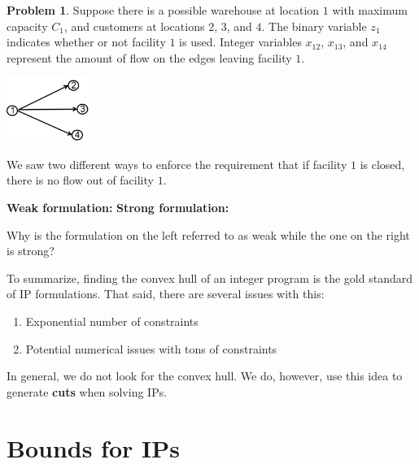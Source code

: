 \documentclass[11pt]{article}
\theoremstyle{definition}
\newtheorem{problem}{Problem}
\newcommand{\answerbox}[3]{%
  \fbox{%
    \begin{minipage}[#1]{#2}
      \hfill\vspace{#3}
    \end{minipage}
  }
}
\begin{document}
\begin{problem}
Suppose there is a possible warehouse at location $1$ with maximum capacity $C_1$, and customers at locations $2$, $3$, and $4$.  The binary variable $z_1$ indicates whether or not facility $1$ is used.  Integer variables $x_{12}$, $x_{13}$, and $x_{14}$ represent the amount of flow on the edges leaving facility $1$.  

\begin{center}
\includegraphics[width=0.2\textwidth]{facility_location}
\end{center}

We saw two different ways to enforce the requirement that if facility $1$ is closed, there is no flow out of facility $1$.

\textbf{Weak formulation:}  \hspace{3.7cm}  \textbf{Strong formulation:}

\answerbox{c}{6cm}{3cm}  \hspace{.8cm} \answerbox{c}{6cm}{3cm}

\end{problem}

Why is the formulation on the left referred to as weak while the one on the right is strong?
\vspace{1in}

\begin{tcolorbox}
To summarize, finding the convex hull of an integer program is the gold standard of IP formulations. That said, there are several issues with this:
	\begin{enumerate}
	\item Exponential number of constraints
	\item Potential numerical issues with tons of constraints
	\end{enumerate}
In general, we do not look for the convex hull. We do, however, use this idea to generate \textbf{cuts} when solving IPs.
\end{tcolorbox}

\newpage

\section{Bounds for IPs}
\end{document}
